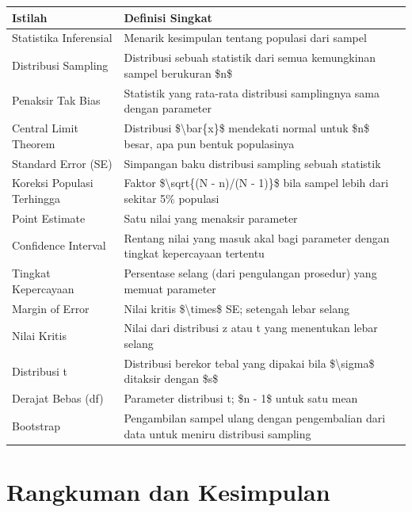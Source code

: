 \documentclass[
  indonesian,
  letterpaper,
]{book}
\begin{document}
\begin{longtable*}[t]{ll}
\toprule
Istilah & Definisi Singkat\\
\midrule
Statistika Inferensial & Menarik kesimpulan tentang populasi dari sampel\\
Distribusi Sampling & Distribusi sebuah statistik dari semua kemungkinan sampel berukuran \$n\$\\
Penaksir Tak Bias & Statistik yang rata-rata distribusi samplingnya sama dengan parameter\\
Central Limit Theorem & Distribusi \$\textbackslash{}bar\{x\}\$ mendekati normal untuk \$n\$ besar, apa pun bentuk populasinya\\
Standard Error (SE) & Simpangan baku distribusi sampling sebuah statistik\\
\addlinespace
Koreksi Populasi Terhingga & Faktor \$\textbackslash{}sqrt\{(N - n)/(N - 1)\}\$ bila sampel lebih dari sekitar 5\% populasi\\
Point Estimate & Satu nilai yang menaksir parameter\\
Confidence Interval & Rentang nilai yang masuk akal bagi parameter dengan tingkat kepercayaan tertentu\\
Tingkat Kepercayaan & Persentase selang (dari pengulangan prosedur) yang memuat parameter\\
Margin of Error & Nilai kritis \$\textbackslash{}times\$ SE; setengah lebar selang\\
\addlinespace
Nilai Kritis & Nilai dari distribusi z atau t yang menentukan lebar selang\\
Distribusi t & Distribusi berekor tebal yang dipakai bila \$\textbackslash{}sigma\$ ditaksir dengan \$s\$\\
Derajat Bebas (df) & Parameter distribusi t; \$n - 1\$ untuk satu mean\\
Bootstrap & Pengambilan sampel ulang dengan pengembalian dari data untuk meniru distribusi sampling\\
\bottomrule
\end{longtable*}
\endgroup{}

\section{Rangkuman dan Kesimpulan}\label{rangkuman-dan-kesimpulan}
\end{document}
